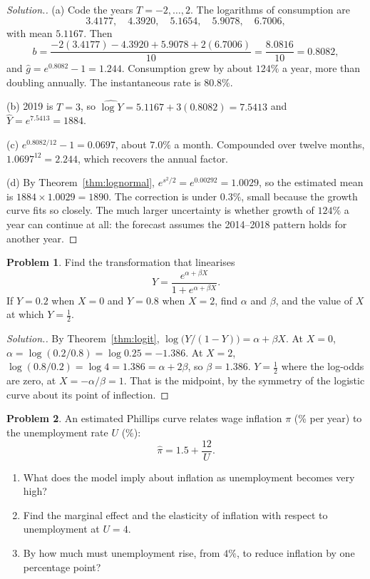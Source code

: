 \documentclass[11pt,a4paper]{article}
\numberwithin{equation}{section}
\theoremstyle{definition}
\newtheorem{problemx}{Problem}[subsection]
\newenvironment{problem}{\begin{problemx}}{\end{problemx}}
\newenvironment{solution}
  {\renewcommand{\qedsymbol}{}\begin{proof}[\textit{Solution}.]}
  {\end{proof}}
\begin{document}
\begin{solution}
(a) Code the years $T = -2, \dots, 2$. The logarithms of consumption are
\[
3.4177,\quad 4.3920,\quad 5.1654,\quad 5.9078,\quad 6.7006,
\]
with mean $5.1167$. Then
\[
b = \frac{-2(3.4177) - 4.3920 + 5.9078 + 2(6.7006)}{10} = \frac{8.0816}{10} = 0.8082 ,
\]
and $\hat g = e^{0.8082} - 1 = 1.244$. Consumption grew by about $124\%$ a year, more than doubling annually. The instantaneous rate is $80.8\%$.

(b) 2019 is $T = 3$, so $\widehat{\log Y} = 5.1167 + 3(0.8082) = 7.5413$ and $\hat Y = e^{7.5413} = 1884$.

(c) $e^{0.8082/12} - 1 = 0.0697$, about $7.0\%$ a month. Compounded over twelve months, $1.0697^{12} = 2.244$, which recovers the annual factor.

(d) By Theorem~\ref{thm:lognormal}, $e^{s^2/2} = e^{0.00292} = 1.0029$, so the estimated mean is $1884 \times 1.0029 = 1890$. The correction is
under $0.3\%$, small because the growth curve fits so closely. The much larger uncertainty is whether growth of $124\%$ a year can continue at
all: the forecast assumes the 2014--2018 pattern holds for another year.
\end{solution}

\begin{problem}
Find the transformation that linearises
\[
Y = \frac{e^{\alpha + \beta X}}{1 + e^{\alpha + \beta X}} .
\]
If $Y = 0.2$ when $X = 0$ and $Y = 0.8$ when $X = 2$, find $\alpha$ and $\beta$, and the value of $X$ at which $Y = \frac12$.
\end{problem}

\begin{solution}
By Theorem~\ref{thm:logit}, $\log\bigl(Y/(1 - Y)\bigr) = \alpha + \beta X$. At $X = 0$, $\alpha = \log(0.2/0.8) = \log 0.25 = -1.386$. At $X = 2$,
$\log(0.8/0.2) = \log 4 = 1.386 = \alpha + 2\beta$, so $\beta = 1.386$. $Y = \frac12$ where the log-odds are zero, at $X = -\alpha/\beta = 1$. That is
the midpoint, by the symmetry of the logistic curve about its point of inflection.
\end{solution}

\begin{problem}
An estimated Phillips curve relates wage inflation $\pi$ (\% per year) to the unemployment rate $U$ (\%):
\[
\hat\pi = 1.5 + \frac{12}{U} .
\]
\begin{enumerate}[label=(\alph*)]
\item What does the model imply about inflation as unemployment becomes very high?
\item Find the marginal effect and the elasticity of inflation with respect to unemployment at $U = 4$.
\item By how much must unemployment rise, from $4\%$, to reduce inflation by one percentage point?
\end{enumerate}
\end{problem}
\end{document}
